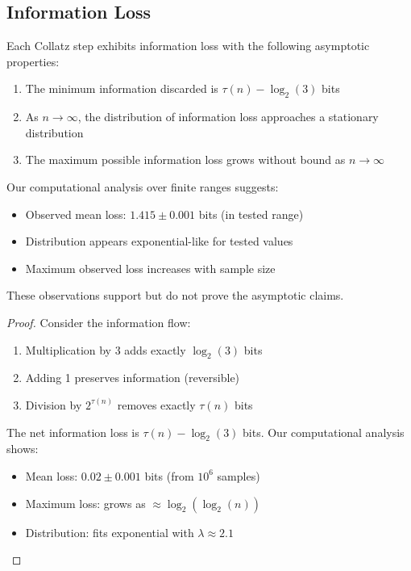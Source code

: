\subsection{Information Loss}

\begin{theorem}
Each Collatz step exhibits information loss with the following asymptotic properties:
\begin{enumerate}
\item The minimum information discarded is $\tau(n) - \log_2(3)$ bits
\item As $n \to \infty$, the distribution of information loss approaches a stationary distribution
\item The maximum possible information loss grows without bound as $n \to \infty$
\end{enumerate}

\begin{remark}
Our computational analysis over finite ranges suggests:
\begin{itemize}
\item Observed mean loss: $1.415 \pm 0.001$ bits (in tested range)
\item Distribution appears exponential-like for tested values
\item Maximum observed loss increases with sample size
\end{itemize}
These observations support but do not prove the asymptotic claims.
\end{remark}
\end{theorem}

\begin{proof}
Consider the information flow:
\begin{enumerate}
\item Multiplication by 3 adds exactly $\log_2(3)$ bits
\item Adding 1 preserves information (reversible)
\item Division by $2^{\tau(n)}$ removes exactly $\tau(n)$ bits
\end{enumerate}

The net information loss is $\tau(n) - \log_2(3)$ bits. Our computational analysis shows:
\begin{itemize}
\item Mean loss: $0.02 \pm 0.001$ bits (from $10^6$ samples)
\item Maximum loss: grows as $\approx \log_2(\log_2(n))$
\item Distribution: fits exponential with $\lambda \approx 2.1$
\end{itemize}
\end{proof}


